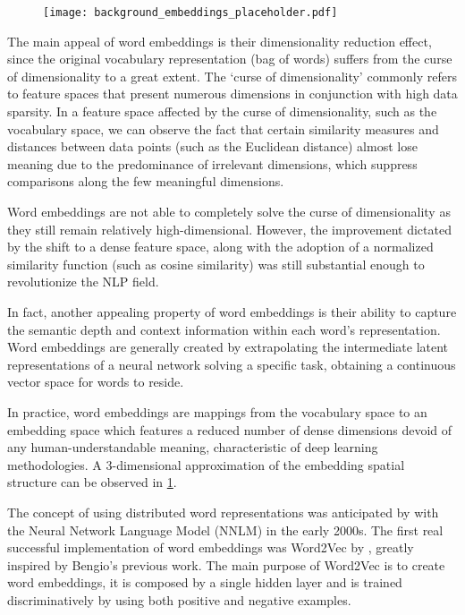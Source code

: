 \begin{figure}[t!]
    \centering
    \texttt{[image: background\_embeddings\_placeholder.pdf]}
    \caption{}
    \label{fig:background_embeddings}
\end{figure}

The main appeal of word embeddings is their dimensionality reduction effect, since the original vocabulary representation (bag of words) suffers from the curse of dimensionality to a great extent.
The `curse of dimensionality' commonly refers to feature spaces that present numerous dimensions in conjunction with high data sparsity.
In a feature space affected by the curse of dimensionality, such as the vocabulary space, we can observe the fact that certain similarity measures and distances between data points (such as the Euclidean distance) almost lose meaning due to the predominance of irrelevant dimensions, which suppress comparisons along the few meaningful dimensions.

Word embeddings are not able to completely solve the curse of dimensionality as they still remain relatively high-dimensional.
However, the improvement dictated by the shift to a dense feature space, along with the adoption of a normalized similarity function (such as cosine similarity) was still substantial enough to revolutionize the NLP field.

In fact, another appealing property of word embeddings is their ability to capture the semantic depth and context information within each word's representation.
Word embeddings are generally created by extrapolating the intermediate latent representations of a neural network solving a specific task, obtaining a continuous vector space for words to reside.

In practice, word embeddings are mappings from the vocabulary space to an embedding space which features a reduced number of dense dimensions devoid of any human-understandable meaning, characteristic of deep learning methodologies.
A $3$-dimensional approximation of the embedding spatial structure can be observed in \cref{fig:background_embeddings}.

The concept of using distributed word representations was anticipated by \citet{bengio2000} with the Neural Network Language Model (NNLM) in the early 2000s.
The first real successful implementation of word embeddings was Word2Vec by \citet{mikolov2013}, greatly inspired by Bengio's previous work.
The main purpose of Word2Vec is to create word embeddings, it is composed by a single hidden layer and is trained discriminatively by using both positive and negative examples.

